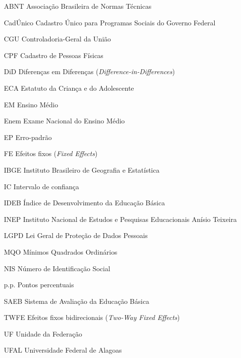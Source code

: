 
\begin{siglas}
    \item[ABNT]     Associação Brasileira de Normas Técnicas
    \item[CadÚnico] Cadastro Único para Programas Sociais do Governo Federal
    \item[CGU]      Controladoria-Geral da União
    \item[CPF]      Cadastro de Pessoas Físicas
    \item[DiD]      Diferenças em Diferenças (\textit{Difference-in-Differences})
    \item[ECA]      Estatuto da Criança e do Adolescente
    \item[EM]       Ensino Médio
    \item[Enem]     Exame Nacional do Ensino Médio
    \item[EP]       Erro-padrão
    \item[FE]       Efeitos fixos (\textit{Fixed Effects})
    \item[IBGE]     Instituto Brasileiro de Geografia e Estatística
    \item[IC]       Intervalo de confiança
    \item[IDEB]     Índice de Desenvolvimento da Educação Básica
    \item[INEP]     Instituto Nacional de Estudos e Pesquisas Educacionais Anísio Teixeira
    \item[LGPD]     Lei Geral de Proteção de Dados Pessoais
    \item[MQO]      Mínimos Quadrados Ordinários
    \item[NIS]      Número de Identificação Social
    \item[p.p.]     Pontos percentuais
    \item[SAEB]     Sistema de Avaliação da Educação Básica
    \item[TWFE]     Efeitos fixos bidirecionais (\textit{Two-Way Fixed Effects})
    \item[UF]       Unidade da Federação
    \item[UFAL]     Universidade Federal de Alagoas
\end{siglas}
